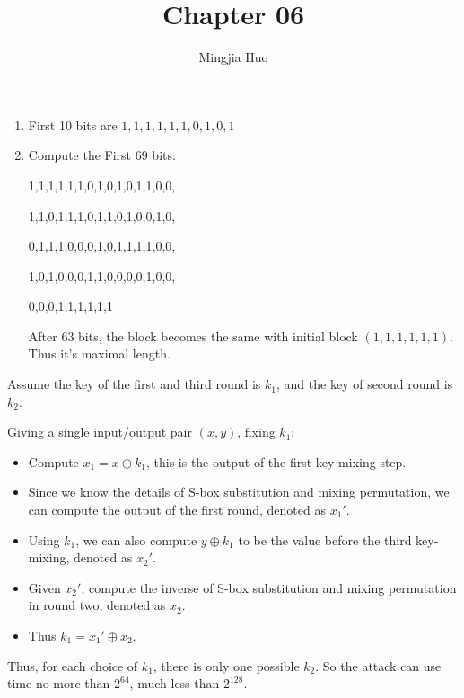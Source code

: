 \documentclass[a4paper]{article}
\newenvironment{problem}[2][Problem]{\begin{trivlist}
\item[\hskip \labelsep {\bfseries #1}\hskip \labelsep {\bfseries #2.}]}{\end{trivlist}}
\begin{document}
 
 
\title{Chapter 06}
\author{Mingjia Huo}
\date{}
\maketitle

\begin{problem}{6.1}
\begin{enumerate}
    \item First 10 bits are $1,1,1,1,1,1,0,1,0,1$
    \item Compute the First 69 bits:\par
    1,1,1,1,1,1,0,1,0,1,0,1,1,0,0,\par
    1,1,0,1,1,1,0,1,1,0,1,0,0,1,0,\par
    0,1,1,1,0,0,0,1,0,1,1,1,1,0,0,\par
    1,0,1,0,0,0,1,1,0,0,0,0,1,0,0,\par
    0,0,0,1,1,1,1,1,1\par
    After 63 bits, the block becomes the same with initial block $(1,1,1,1,1,1)$. Thus it's maximal length.\par
\end{enumerate}
\end{problem}
\begin{problem}{6.6(b)}
Assume the key of the first and third round is $k_1$, and the key of second round is $k_2$.\par
Giving a single input/output pair $(x,y)$, fixing $k_1$:
\begin{itemize}
    \item Compute $x_1=x\oplus k_1$, this is the output of the first key-mixing step.
    \item Since we know the details of S-box substitution and mixing permutation, we can compute the output of the first round, denoted as $x_1'$.
    \item Using $k_1$, we can also compute $y\oplus k_1$ to be the value before the third key-mixing, denoted as $x_2'$.
    \item Given $x_2'$, compute the inverse of S-box substitution and mixing permutation in round two, denoted as $x_2$. 
    \item Thus $k_1=x_1'\oplus x_2$.
\end{itemize}
Thus, for each choice of $k_1$, there is only one possible $k_2$. So the attack can use time no more than $2^{64}$, much less than $2^{128}$.
\end{problem}
\end{document}
